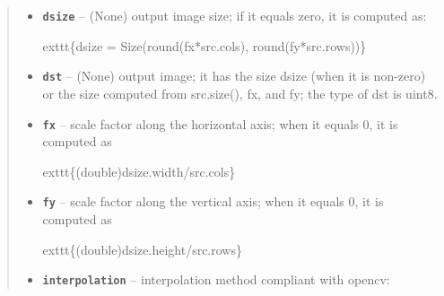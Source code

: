 \documentclass[letterpaper,10pt,english]{sphinxmanual}
\begin{document}
\begin{fulllineitems}
\begin{quote}
\begin{description}
\begin{itemize}
\item {} 
\textbf{\texttt{dsize}} -- 
(None) output image size; if it equals zero, it is computed as:

exttt\{dsize = Size(round(fx*src.cols), round(fy*src.rows))\}


\item {} 
\textbf{\texttt{dst}} -- (None) output image; it has the size dsize (when it is non-zero) or the
size computed from src.size(), fx, and fy; the type of dst is uint8.

\item {} 
\textbf{\texttt{fx}} -- 
scale factor along the horizontal axis; when it equals 0, it is computed as

exttt\{(double)dsize.width/src.cols\}


\item {} 
\textbf{\texttt{fy}} -- 
scale factor along the vertical axis; when it equals 0, it is computed as

exttt\{(double)dsize.height/src.rows\}


\item {} 
\textbf{\texttt{interpolation}} -- 
interpolation method compliant with opencv:


\end{itemize}
\end{description}
\end{quote}
\end{fulllineitems}
\end{document}
